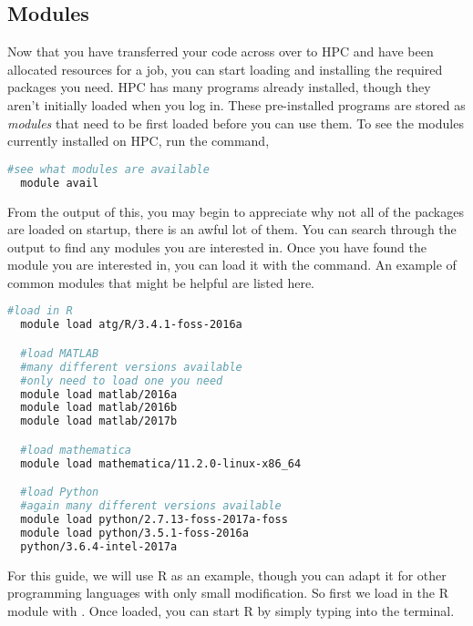 \subsection{Modules}
Now that you have transferred your code across over to HPC and have been allocated resources for a job, you can start loading and installing the required packages you need. HPC has many programs already installed, though they aren't initially loaded when you log in. These pre-installed programs are stored as \textit{modules} that need to be first loaded before you can use them. To see the modules currently installed on HPC, run the command,
%
%
\begin{lstlisting}[language=bash, frame=single]
  #see what modules are available
  module avail
\end{lstlisting}
From the output of this, you may begin to appreciate why not all of the packages are loaded on startup, there is an awful lot of them. You can search through the output to find any modules you are interested in. Once you have found the module you are interested in, you can load it with the  command. An example of common modules that might be helpful are listed here.
%
%
\begin{lstlisting}[language=bash, frame=single]
  #load in R
  module load atg/R/3.4.1-foss-2016a

  #load MATLAB
  #many different versions available
  #only need to load one you need
  module load matlab/2016a 
  module load matlab/2016b 
  module load matlab/2017b

  #load mathematica
  module load mathematica/11.2.0-linux-x86_64

  #load Python
  #again many different versions available
  module load python/2.7.13-foss-2017a-foss
  module load python/3.5.1-foss-2016a
  python/3.6.4-intel-2017a
\end{lstlisting}
%
%
%
For this guide, we will use R as an example, though you can adapt it for other programming languages with only small modification. So first we load in the R module with . Once loaded, you can start R by simply typing  into the terminal.
%
%
%
